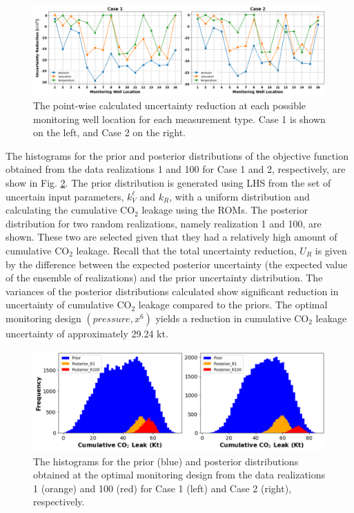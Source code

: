 \documentclass[a4paper,fleqn]{cas-sc}
\begin{document}
\begin{figure}
    \centering
    \includegraphics[width=16cm]{figs/Figure 11.pdf}
    \caption{The point-wise calculated uncertainty reduction at each possible monitoring well location for each measurement type. Case 1 is shown on the left, and Case 2 on the right.}
    \label{point_ur}
\end{figure}

The histograms for the prior and posterior distributions of the objective function obtained from the data realizations 1 and 100 for Case 1 and 2, respectively, are show in Fig. \ref{ur_dist}. The prior distribution is generated using LHS from the set of uncertain input parameters, $k_V^\ell$ and $k_R$, with a uniform distribution and calculating the cumulative CO$_2$ leakage using the ROMs. The posterior distribution for two random realizations, namely realization 1 and 100, are shown. These two are selected given that they had a relatively high amount of cumulative CO$_2$ leakage. Recall that the total uncertainty reduction, $U_R$ is given by the difference between the expected posterior uncertainty (the expected value of the ensemble of realizations) and the prior uncertainty distribution. The variances of the posterior distributions calculated show significant reduction in uncertainty of cumulative CO$_2$ leakage compared to the priors. The optimal monitoring design $(pressure, x^6)$ yields a reduction in cumulative CO$_2$ leakage uncertainty of approximately 29.24 kt. 

\begin{figure}
    \centering
    \includegraphics[width=16cm]{figs/Figure 12.pdf}
    \caption{The histograms for the prior (blue) and posterior distributions obtained at the optimal monitoring design from the data realizations 1 (orange) and 100 (red) for Case 1 (left) and Case 2 (right), respectively.}
    \label{ur_dist}
\end{figure}
\end{document}
